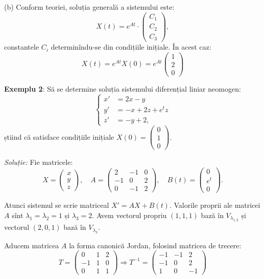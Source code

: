 (b) Conform teoriei, soluția generală a sistemului este:
\[
  X(t) = e^{At} \cdot \begin{pmatrix}
    C_1 \\ C_2 \\ C_3
  \end{pmatrix},
\]
constantele $C_i$ determinîndu-se din condițiile inițiale. În acest caz:
\[
  X(t) = e^{At} X(0) = e^{At}
  \begin{pmatrix}
    1 \\ 2 \\ 0 
  \end{pmatrix}
\]

\vspace{0.5cm}

\textbf{Exemplu 2}: Să se determine soluția sistemului diferențial liniar neomogen:
\[
  \begin{cases}
    x' &= 2x - y \\
    y' &= -x + 2z + e^t z \\
    z' &= -y + 2,
  \end{cases}
\]
știind că satisface condițiile inițiale $X(0) = \begin{pmatrix} 0 \\ 1 \\ 0 \end{pmatrix}$.

\emph{Soluție:} Fie matricele:
\[
  X = \begin{pmatrix}
    x \\ y \\ z 
  \end{pmatrix}, \quad
  A = \begin{pmatrix}
    2 & -1 & 0 \\
    -1 & 0 & 2 \\
    0 & -1 & 2 
  \end{pmatrix}, \quad
  B(t) = \begin{pmatrix}
    0 \\ e^t \\ 0
  \end{pmatrix}.
\]

Atunci sistemul se scrie matriceal $X' = AX + B(t)$. Valorile proprii ale matricei $A$
sînt $\lambda_1 = \lambda_2 = 1$ și $\lambda_3 = 2$. Avem vectorul propriu $(1, 1, 1)$
bază în $V_{\lambda_{1,2}}$ și vectorul $(2, 0, 1)$ bază în $V_{\lambda_3}$.

Aducem matricea $A$ la forma canonică Jordan, folosind matricea de trecere:
\[
  T = \begin{pmatrix}
    0 & 1 & 2 \\
    -1 & 1 & 0 \\
    0 & 1 & 1
  \end{pmatrix} \Rightarrow
  T^{-1} = \begin{pmatrix}
    -1 & -1 & 2 \\
    -1 & 0 & 2 \\
    1 & 0 & -1
  \end{pmatrix}
\]

